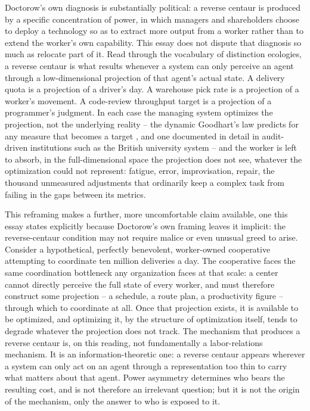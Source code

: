 \documentclass[11pt]{article}
\theoremstyle{plain}
\begin{document}
Doctorow's own diagnosis is substantially political: a reverse centaur is produced by a specific concentration of power, in which managers and shareholders choose to deploy a technology so as to extract more output from a worker rather than to extend the worker's own capability. This essay does not dispute that diagnosis so much as relocate part of it. Read through the vocabulary of distinction ecologies, a reverse centaur is what results whenever a system can only perceive an agent through a low-dimensional projection of that agent's actual state. A delivery quota is a projection of a driver's day. A warehouse pick rate is a projection of a worker's movement. A code-review throughput target is a projection of a programmer's judgment. In each case the managing system optimizes the projection, not the underlying reality -- the dynamic Goodhart's law predicts for any measure that becomes a target \cite{goodhart1975}, and one documented in detail in audit-driven institutions such as the British university system \cite{strathern1997} -- and the worker is left to absorb, in the full-dimensional space the projection does not see, whatever the optimization could not represent: fatigue, error, improvisation, repair, the thousand unmeasured adjustments that ordinarily keep a complex task from failing in the gaps between its metrics.

This reframing makes a further, more uncomfortable claim available, one this essay states explicitly because Doctorow's own framing leaves it implicit: the reverse-centaur condition may not require malice or even unusual greed to arise. Consider a hypothetical, perfectly benevolent, worker-owned cooperative attempting to coordinate ten million deliveries a day. The cooperative faces the same coordination bottleneck any organization faces at that scale: a center cannot directly perceive the full state of every worker, and must therefore construct some projection -- a schedule, a route plan, a productivity figure -- through which to coordinate at all. Once that projection exists, it is available to be optimized, and optimizing it, by the structure of optimization itself, tends to degrade whatever the projection does not track. The mechanism that produces a reverse centaur is, on this reading, not fundamentally a labor-relations mechanism. It is an information-theoretic one: a reverse centaur appears wherever a system can only act on an agent through a representation too thin to carry what matters about that agent. Power asymmetry determines who bears the resulting cost, and is not therefore an irrelevant question; but it is not the origin of the mechanism, only the answer to who is exposed to it.
\end{document}
